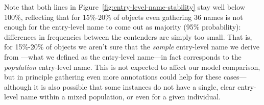 Note that both lines in Figure~\ref{fig:entry-level-name-stability} stay well below 100\%, reflecting that for 15\%-20\% of objects even gathering 36 names is not enough for the entry-level name to come out as majority (95\% probability): differences in frequencies between the contenders are simply too small.
That is, for 15\%-20\% of objects we aren't sure that the \emph{sample} entry-level name we derive from \mn---what we defined as the entry-level name---in fact corresponds to the \emph{population} entry-level name.
This is not expected to affect our model comparison, but in principle gathering even more annotations could help for these cases---although it is also possible that some instances do not have a single, clear entry-level name within a mixed population, or even for a given individual.




